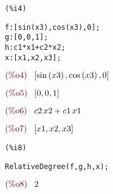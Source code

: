 \noindent
\begin{minipage}[t]{8ex}
\color{red}\bf
\begin{verbatim}
(%i4) 
\end{verbatim}
\end{minipage}
\begin{minipage}[t]{\textwidth}
\color{blue}
\begin{verbatim}
f:[sin(x3),cos(x3),0];
g:[0,0,1];
h:c1*x1+c2*x2;
x:[x1,x2,x3];
\end{verbatim}
\end{minipage}
\begin{math}\displaystyle
\parbox{8ex}{\color{labelcolor}(\%o4) }
[\mathrm{sin}\left( x3\right) ,\mathrm{cos}\left( x3\right) ,0]
\end{math}

\noindent
\begin{math}\displaystyle
\parbox{8ex}{\color{labelcolor}(\%o5) }
[0,0,1]
\end{math}

\noindent
\begin{math}\displaystyle
\parbox{8ex}{\color{labelcolor}(\%o6) }
c2\,x2+c1\,x1
\end{math}

\noindent
\begin{math}\displaystyle
\parbox{8ex}{\color{labelcolor}(\%o7) }
[x1,x2,x3]
\end{math}


\noindent
\begin{minipage}[t]{8ex}
\color{red}\bf
\begin{verbatim}
(%i8) 
\end{verbatim}
\end{minipage}
\begin{minipage}[t]{\textwidth}
\color{blue}
\begin{verbatim}
RelativeDegree(f,g,h,x);
\end{verbatim}
\end{minipage}
\begin{math}\displaystyle
\parbox{8ex}{\color{labelcolor}(\%o8) }
2
\end{math}
